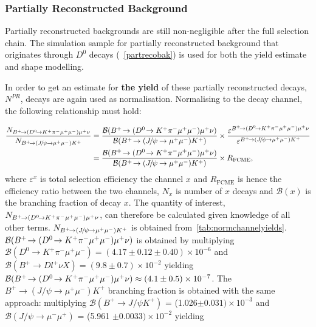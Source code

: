 \subsubsection{Partially Reconstructed Background}
\label{finfitpr}
Partially reconstructed backgrounds are still non-negligible after the full selection chain. 
 The simulation sample for \DIFaddbegin {}\DIFaddend partially reconstructed background that originates through $D^{0}$ decays (~\autoref{partrecobak}) is used for both the yield estimate and shape modelling.

In order to get an estimate for \textbf{the yield} of these partially reconstructed decays, $N^{PR}$, \bjpsimumuk decays are again used as normalisation. Normalising to the \bjpsimumuk decay channel, the following relationship must hold: 

\begin{equation}
\begin{split}
\frac{N_{\pr}}{N_{\bjpsimumuk}}&= \frac{\mathcal{B}(\pr)}{\mathcal{B}(\bjpsimumuk)} \times \frac{\varepsilon^{\pr}}{\varepsilon^{\bjpsimumuk}} \\
&=\frac{\mathcal{B}(\pr)}{\mathcal{B}(\bjpsimumuk)} \times R_{\mathrm{FCME}},
\end{split}
\end{equation}
	where $\varepsilon^{x}$ is \DIFaddbegin {}\DIFaddend total selection efficiency \DIFdelbegin {}\DIFdelend \DIFaddbegin {}\DIFaddend the channel $x$ and $R_{\mathrm{FCME}}$ is hence the efficiency ratio between the two channels, $N_{x}$ is \DIFaddbegin {}\DIFaddend number of $x$ decays and $\mathcal{B}(x)$ is the branching fraction of decay $x$. The quantity of \DIFaddbegin {}\DIFaddend interest, $N_{{{{B}^+}}\!\rightarrow ({{D}^0}\!\rightarrow {\ensuremath{{K}^+}}{\ensuremath{{\pi}^-}}{\ensuremath{\mu^+\mu^-}}){\mu^+}\nu}$, can therefore be calculated given \DIFdelbegin {}\DIFdelend knowledge of all other terms. $N_{{{{B}^+}}\!\rightarrow ({{J\mskip -3mu/\mskip -2mu\psi\mskip 2mu}}\!\rightarrow {\ensuremath{\mu^+\mu^-}}){{K}^+}}$ is obtained from~\autoref{tab:normchannelyields}. $\mathcal{B}({{{B}^+}}\!\rightarrow ({{D}^0}\!\rightarrow {\ensuremath{{K}^+}}{\ensuremath{{\pi}^-}}{\ensuremath{\mu^+\mu^-}}){\mu^+}\nu)$ is obtained by multiplying $\mathcal{B}(D^{0} \rightarrow K^+ \pi^- \mu^+ \mu^{-}) = (4.17\pm0.12\pm0.40)\times 10^{-6}$\cite{Aaij:2015hva} and $\mathcal{B}(B^{+} \rightarrow D l^{+} \nu X) = (9.8 \pm 0.7)\times 10^{-2}$ \cite{Patrignani:2016xqp} yielding $\mathcal{B}({{{B}^+}}\!\rightarrow ({{D}^0}\!\rightarrow {\ensuremath{{K}^+}}{\ensuremath{{\pi}^-}}{\ensuremath{\mu^+\mu^-}}){\mu^+}\nu) \approx (4.1\pm0.5)\times 10 ^{-7 }$. The $B^+ \rightarrow (J/\psi \rightarrow \mu^+ \mu^{-}) K^{+}$ branching fraction is obtained with the same approach: multiplying $\mathcal{B}(B^{+} \rightarrow J/\psi K^{+})$ = (1.026$\pm 0.031)\times 10^{-3}$\cite{Patrignani:2016xqp} and $\mathcal{B}(J/\psi \rightarrow \mu^{-} \mu^{+})$ = (5.961 $\pm0.0033) \times 10^{-2}$\cite{Patrignani:2016xqp} yielding 

